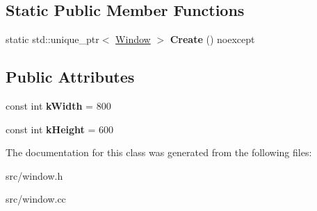 \subsection*{Static Public Member Functions}
\begin{DoxyCompactItemize}
\item 
\hypertarget{classae_1_1_window_a2a1621593063438ea086a68fc9284997}{}\label{classae_1_1_window_a2a1621593063438ea086a68fc9284997} 
static std\+::unique\+\_\+ptr$<$ \hyperlink{classae_1_1_window}{Window} $>$ {\bfseries Create} () noexcept
\end{DoxyCompactItemize}
\subsection*{Public Attributes}
\begin{DoxyCompactItemize}
\item 
\hypertarget{classae_1_1_window_a8152047ad073d1694dbbb0d594b2138c}{}\label{classae_1_1_window_a8152047ad073d1694dbbb0d594b2138c} 
const int {\bfseries k\+Width} = 800
\item 
\hypertarget{classae_1_1_window_a7eaeaf8b679b92baa7270905b8366730}{}\label{classae_1_1_window_a7eaeaf8b679b92baa7270905b8366730} 
const int {\bfseries k\+Height} = 600
\end{DoxyCompactItemize}


The documentation for this class was generated from the following files\+:\begin{DoxyCompactItemize}
\item 
src/window.\+h\item 
src/window.\+cc\end{DoxyCompactItemize}
